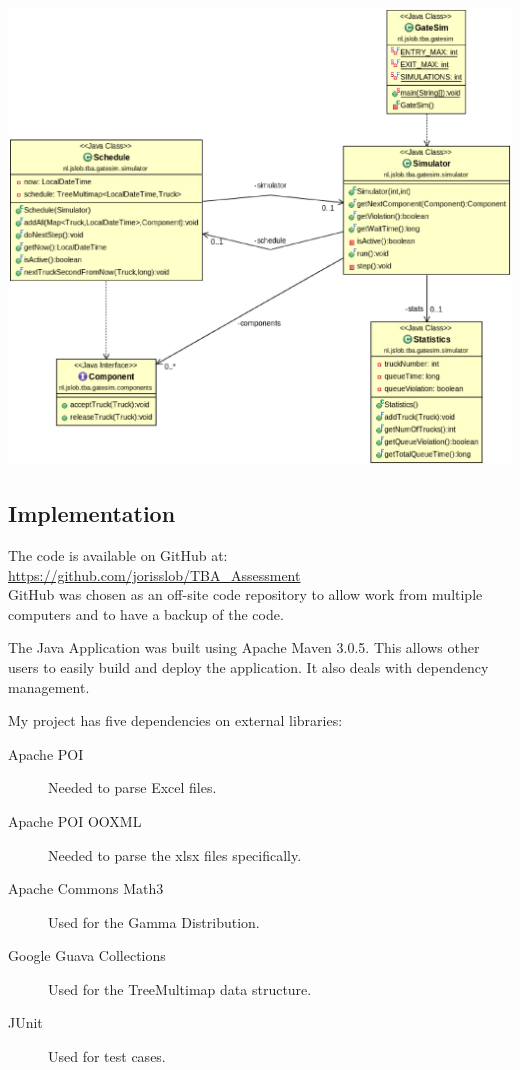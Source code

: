 \documentclass{article}
\begin{document}
\includegraphics[scale=0.4]{Simulator.eps}

\subsection{Implementation}

The code is available on GitHub at:\\ 
\url{https://github.com/jorisslob/TBA_Assessment}\\ 
GitHub was chosen as an off-site code repository to allow work from
multiple computers and to have a backup of the code.

The Java Application was built using Apache Maven 3.0.5. This allows
other users to easily build and deploy the application. It also deals
with dependency management.

\begin{samepage}
My project has five dependencies on external libraries:
\begin{description}
\item[Apache POI] Needed to parse Excel files.
\item[Apache POI OOXML] Needed to parse the xlsx files specifically.
\item[Apache Commons Math3] Used for the Gamma Distribution.
\item[Google Guava Collections] Used for the TreeMultimap data structure.
\item[JUnit] Used for test cases.
\end{description}
\end{samepage}
\end{document}
